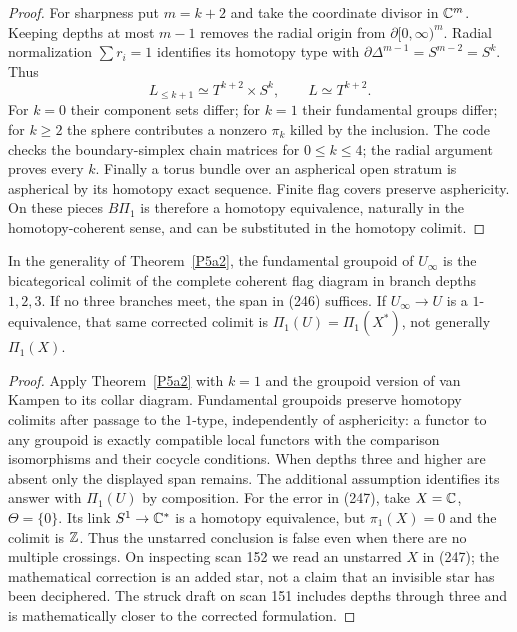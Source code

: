 \begin{proof}
For sharpness put $m=k+2$ and take the coordinate divisor in $\mathbb C^m$.
Keeping depths at most $m-1$ removes the radial origin from
$\partial[0,\infty)^m$.  Radial normalization $\sum r_i=1$ identifies
its homotopy type with $\partial\Delta^{m-1}=S^{m-2}=S^k$.  Thus
\[
 L_{\le k+1}\simeq T^{k+2}\times S^k,
 \qquad L\simeq T^{k+2}.
\]
For $k=0$ their component sets differ; for $k=1$ their fundamental
groups differ; for $k\ge2$ the sphere contributes a nonzero
$\pi_k$ killed by the inclusion.  The code checks the boundary-simplex
chain matrices for $0\le k\le4$; the radial argument proves every $k$.
Finally a torus bundle over an aspherical open stratum is aspherical
by its homotopy exact sequence.  Finite flag covers preserve
asphericity.  On these pieces $B\Pi_1$ is therefore a homotopy
equivalence, naturally in the homotopy-coherent sense, and can be
substituted in the homotopy colimit.
\end{proof}

\begin{corollary}\label{P5a3}
In the generality of Theorem~\ref{P5a2}, the fundamental groupoid of
$U_\infty$ is the bicategorical colimit of the complete coherent flag
diagram in branch depths $1,2,3$.  If no three branches meet, the span
in (246) suffices.  If $U_\infty\to U$ is a $1$-equivalence, that same
corrected colimit is $\Pi_1(U)=\Pi_1(X^*)$, not generally $\Pi_1(X)$.
\end{corollary}
\begin{proof}
Apply Theorem~\ref{P5a2} with $k=1$ and the groupoid version of van
Kampen to its collar diagram.  Fundamental groupoids preserve
homotopy colimits after passage to the $1$-type, independently of
asphericity: a functor to any groupoid is exactly compatible local
functors with the comparison isomorphisms and their cocycle conditions.
When depths three and higher are absent only the displayed span
remains.  The additional assumption identifies its answer with
$\Pi_1(U)$ by composition.
For the error in (247), take $X=\mathbb C$, $\Theta=\{0\}$.  Its link
$S^1\to\mathbb C^*$ is a homotopy equivalence, but $\pi_1(X)=0$ and the
colimit is $\mathbb Z$.  Thus the unstarred conclusion is false even when
there are no multiple crossings.  On inspecting scan 152 we read
an unstarred $X$ in (247); the mathematical correction is an added
star, not a claim that an invisible star has been deciphered.  The
struck draft on scan 151 includes depths through three and is
mathematically closer to the corrected formulation.
\end{proof}

